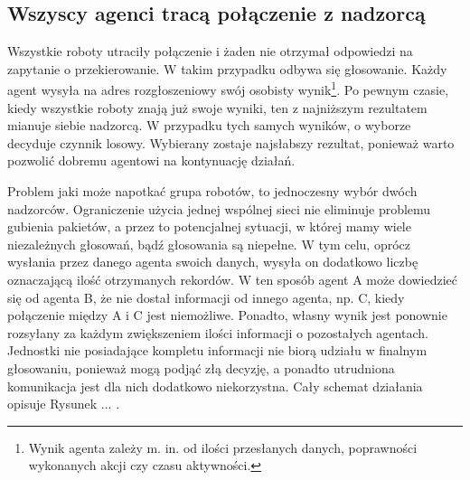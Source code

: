 \subsection{Wszyscy agenci tracą połączenie z nadzorcą}

Wszystkie roboty utraciły połączenie i żaden nie otrzymał odpowiedzi na zapytanie o przekierowanie. W takim przypadku odbywa się głosowanie. Każdy agent wysyła na adres rozgłoszeniowy swój osobisty wynik\footnote{Wynik agenta zależy m. in. od ilości przesłanych danych, poprawności wykonanych akcji czy czasu aktywności.}. Po pewnym czasie, kiedy wszystkie roboty znają już swoje wyniki, ten z najniższym rezultatem mianuje siebie nadzorcą. W przypadku tych samych wyników, o wyborze decyduje czynnik losowy. Wybierany zostaje najsłabszy rezultat, ponieważ warto pozwolić dobremu agentowi na kontynuację działań.

Problem jaki może napotkać grupa robotów, to jednoczesny wybór dwóch nadzorców. Ograniczenie użycia jednej wspólnej sieci nie eliminuje problemu gubienia pakietów, a przez to potencjalnej sytuacji, w której mamy wiele niezależnych głosowań, bądź głosowania są niepełne. W tym celu, oprócz wysłania przez danego agenta swoich danych, wysyła on dodatkowo liczbę oznaczającą ilość otrzymanych rekordów. W ten sposób agent A może dowiedzieć się od agenta B, że nie dostał informacji od innego agenta, np. C, kiedy połączenie między A i C jest niemożliwe. Ponadto, własny wynik jest ponownie rozsyłany za każdym zwiększeniem ilości informacji o pozostałych agentach. Jednostki nie posiadające kompletu informacji nie biorą udziału w finalnym głosowaniu, ponieważ mogą podjąć złą decyzję, a ponadto utrudniona komunikacja jest dla nich dodatkowo niekorzystna. Cały schemat działania opisuje Rysunek ... .

